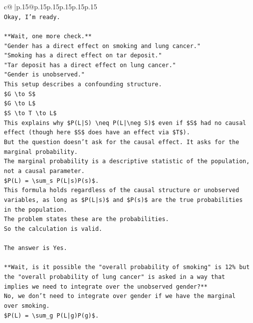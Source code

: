 \documentclass{article}
\begin{document}
{\begin{supertabular}{c@{$\;$}|p{.15\linewidth}@{}p{.15\linewidth}p{.15\linewidth}p{.15\linewidth}p{.15\linewidth}p{.15\linewidth}}
{{{\\ 
\texttt{Okay, I'm ready.} \\
\\ 
\texttt{**Wait, one more check.**} \\
\texttt{"Gender has a direct effect on smoking and lung cancer."} \\
\texttt{"Smoking has a direct effect on tar deposit."} \\
\texttt{"Tar deposit has a direct effect on lung cancer."} \\
\texttt{"Gender is unobserved."} \\
\texttt{This setup describes a confounding structure.} \\
\texttt{\$G \textbackslash{}to S\$} \\
\texttt{\$G \textbackslash{}to L\$} \\
\texttt{\$S \textbackslash{}to T \textbackslash{}to L\$} \\
\texttt{This explains why \$P(L|S) \textbackslash{}neq P(L|\textbackslash{}neg S)\$ even if \$S\$ had no causal effect (though here \$S\$ does have an effect via \$T\$).} \\
\texttt{But the question doesn't ask for the causal effect. It asks for the marginal probability.} \\
\texttt{The marginal probability is a descriptive statistic of the population, not a causal parameter.} \\
\texttt{\$P(L) = \textbackslash{}sum\_s P(L|s)P(s)\$.} \\
\texttt{This formula holds regardless of the causal structure or unobserved variables, as long as \$P(L|s)\$ and \$P(s)\$ are the true probabilities in the population.} \\
\texttt{The problem states these are the probabilities.} \\
\texttt{So the calculation is valid.} \\
\\ 
\texttt{The answer is Yes.} \\
\\ 
\texttt{**Wait, is it possible the "overall probability of smoking" is 12\% but the "overall probability of lung cancer" is asked in a way that implies we need to integrate over the unobserved gender?**} \\
\texttt{No, we don't need to integrate over gender if we have the marginal over smoking.} \\
\texttt{\$P(L) = \textbackslash{}sum\_g P(L|g)P(g)\$.} \\
}}}
\end{supertabular}}
\end{document}
